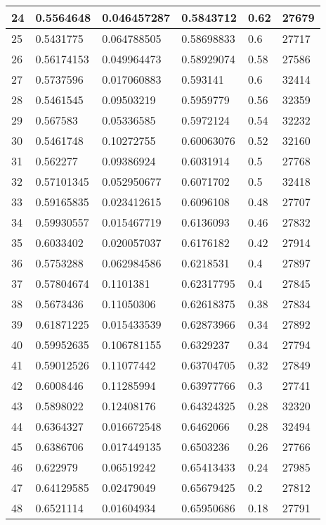 \begin{longtable}{|l|l|l|l|l|l|}
24 & 0.5564648 & 0.046457287 & 0.5843712 & 0.62 & 27679 \\ \hline 
25 & 0.5431775 & 0.064788505 & 0.58698833 & 0.6 & 27717 \\ \hline 
26 & 0.56174153 & 0.049964473 & 0.58929074 & 0.58 & 27586 \\ \hline 
27 & 0.5737596 & 0.017060883 & 0.593141 & 0.6 & 32414 \\ \hline 
28 & 0.5461545 & 0.09503219 & 0.5959779 & 0.56 & 32359 \\ \hline 
29 & 0.567583 & 0.05336585 & 0.5972124 & 0.54 & 32232 \\ \hline 
30 & 0.5461748 & 0.10272755 & 0.60063076 & 0.52 & 32160 \\ \hline 
31 & 0.562277 & 0.09386924 & 0.6031914 & 0.5 & 27768 \\ \hline 
32 & 0.57101345 & 0.052950677 & 0.6071702 & 0.5 & 32418 \\ \hline 
33 & 0.59165835 & 0.023412615 & 0.6096108 & 0.48 & 27707 \\ \hline 
34 & 0.59930557 & 0.015467719 & 0.6136093 & 0.46 & 27832 \\ \hline 
35 & 0.6033402 & 0.020057037 & 0.6176182 & 0.42 & 27914 \\ \hline 
36 & 0.5753288 & 0.062984586 & 0.6218531 & 0.4 & 27897 \\ \hline 
37 & 0.57804674 & 0.1101381 & 0.62317795 & 0.4 & 27845 \\ \hline 
38 & 0.5673436 & 0.11050306 & 0.62618375 & 0.38 & 27834 \\ \hline 
39 & 0.61871225 & 0.015433539 & 0.62873966 & 0.34 & 27892 \\ \hline 
40 & 0.59952635 & 0.106781155 & 0.6329237 & 0.34 & 27794 \\ \hline 
41 & 0.59012526 & 0.11077442 & 0.63704705 & 0.32 & 27849 \\ \hline 
42 & 0.6008446 & 0.11285994 & 0.63977766 & 0.3 & 27741 \\ \hline 
43 & 0.5898022 & 0.12408176 & 0.64324325 & 0.28 & 32320 \\ \hline 
44 & 0.6364327 & 0.016672548 & 0.6462066 & 0.28 & 32494 \\ \hline 
45 & 0.6386706 & 0.017449135 & 0.6503236 & 0.26 & 27766 \\ \hline 
46 & 0.622979 & 0.06519242 & 0.65413433 & 0.24 & 27985 \\ \hline 
47 & 0.64129585 & 0.02479049 & 0.65679425 & 0.2 & 27812 \\ \hline 
48 & 0.6521114 & 0.01604934 & 0.65950686 & 0.18 & 27791 \\ \hline 

\end{longtable}
